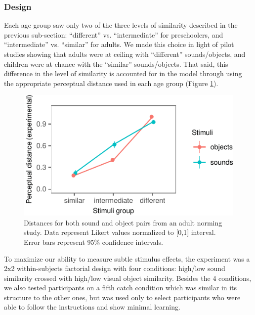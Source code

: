 \documentclass[10pt, letterpaper]{article}
\newenvironment{CodeChunk}{}{}
\begin{document}
\subsubsection{Design}\label{design}

Each age group saw only two of the three levels of similarity described
in the previous sub-section: ``different'' vs. ``intermediate'' for
preschoolers, and ``intermediate'' vs. ``similar'' for adults. We made
this choice in light of pilot studies showing that adults were at
ceiling with ``different'' sounds/objects, and children were at chance
with the ``similar'' sounds/objects. That said, this difference in the
level of similarity is accounted for in the model through using the
appropriate perceptual distance used in each age group (Figure
\ref{fig:stim}).

\begin{CodeChunk}
\begin{figure}[h]

{\centering \includegraphics{figs/stim-1} 

}

\caption{\label{fig:stim}Distances for both sound and object pairs from an adult norming study. Data represent Likert values normalized to [0,1] interval. Error bars represent 95\% confidence intervals.}\label{fig:stim}
\end{figure}
\end{CodeChunk}

To maximize our ability to measure subtle stimulus effects, the
experiment was a 2x2 within-subjects factorial design with four
conditions: high/low sound similarity crossed with high/low visual
object similarity. Besides the 4 conditions, we also tested participants
on a fifth catch condition which was similar in its structure to the
other ones, but was used only to select participants who were able to
follow the instructions and show minimal learning.
\end{document}
